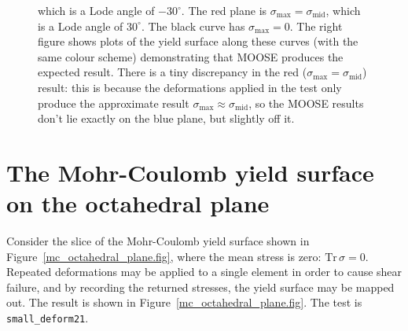 \documentclass[]{scrreprt}
\newcommand{\tr}{\mbox{Tr}\,}
\newcommand{\smax}{\sigma_{\mathrm{max}}}
\newcommand{\smid}{\sigma_{\mathrm{mid}}}
\begin{document}
\begin{figure}[htb]
\begin{center}
{  which is a Lode angle of $-30^{\circ}$.  The red plane is
  $\smax=\smid$, which is a Lode angle of $30^{\circ}$.  The black
  curve has $\smax=0$.  The right figure shows plots of the yield
  surface along these curves (with the same colour scheme)
  demonstrating that MOOSE produces the expected result.  There is a
  tiny discrepancy in the red ($\smax=\smid$) result: this is because
  the deformations applied in the test only produce the approximate
  result $\smax\approx\smid$, so the MOOSE results don't lie exactly
  on the blue plane, but slightly off it.}
\label{small_deform_15_16_17.fig}
\end{center}
\end{figure}


\section{The Mohr-Coulomb yield surface on the octahedral plane}

Consider the slice of the Mohr-Coulomb yield surface shown in
Figure~\ref{mc_octahedral_plane.fig}, where the mean stress is zero:
$\tr\sigma = 0$.  Repeated deformations may be applied to a single element in order to
cause shear failure, and by recording the returned stresses, the yield
surface may be mapped out.   The result is shown in
Figure~\ref{mc_octahedral_plane.fig}.  The test is {\tt small\_deform21}.
\end{document}
